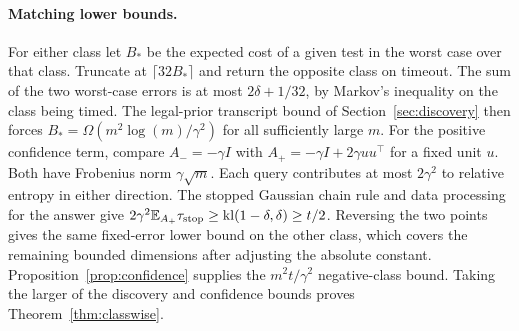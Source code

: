 \paragraph{Matching lower bounds.}
For either class let \(B_*\) be the expected cost of a given test in the worst case over that class. Truncate at \(\lceil32 B_*\rceil\) and return the opposite class on timeout. The sum of the two worst-case errors is at most \(2\delta+1/32\), by Markov's inequality on the class being timed. The legal-prior transcript bound of Section~\ref{sec:discovery} then forces \(B_*=\Omega(m^2\log(m)/\gamma^2)\) for all sufficiently large \(m\). For the positive confidence term, compare \(A_-=-\gamma I\) with \(A_+=-\gamma I+2\gamma uu^\top\) for a fixed unit \(u\). Both have Frobenius norm \(\gamma\sqrt m\). Each query contributes at most \(2\gamma^2\) to relative entropy in either direction. The stopped Gaussian chain rule and data processing for the answer give \(2\gamma^2\mathbb E_{A_+}\tau_{\rm stop}\ge\operatorname{kl}(1-\delta,\delta)\ge t/2\). Reversing the two points gives the same fixed-error lower bound on the other class, which covers the remaining bounded dimensions after adjusting the absolute constant. Proposition~\ref{prop:confidence} supplies the \(m^2t/\gamma^2\) negative-class bound. Taking the larger of the discovery and confidence bounds proves Theorem~\ref{thm:classwise}.
